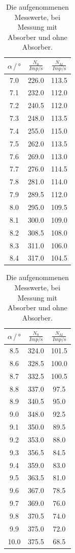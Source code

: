 \begin{table}
  \centering
  \caption{Die aufgenommenen Messwerte, bei Messung mit Absorber und ohne Absorber.}
  \begin{tabular}[t]{ccc}
  \toprule
  $\alpha \,/\, \si{\degree}$ & $\frac{N_0}{Imp/\si{\second}}$ & $\frac{N_\text{Al}}{Imp/\si{\second}}$ \\
  \midrule
  7.0 & 226.0 & 113.5 \\
  7.1 & 232.0 & 112.0\\
  7.2 & 240.5 & 112.0\\
  7.3 & 248.0 & 113.5\\
  7.4 & 255.0 & 115.0\\
  7.5 & 262.0 & 113.5\\
  7.6 & 269.0 & 113.0\\
  7.7 & 276.0 & 114.5\\
  7.8 & 281.0 & 114.0\\
  7.9 & 289.5 & 112.0\\
  8.0 & 295.0 & 109.5\\
  8.1 & 300.0 & 109.0\\
  8.2 & 308.5 & 108.0\\
  8.3 & 311.0 & 106.0\\
  8.4 & 317.0 & 104.5\\
  \bottomrule
\end{tabular}
\begin{tabular}[t]{ccc}
  \toprule
  $\alpha \,/\, \si{\degree}$ & $\frac{N_0}{Imp/\si{\second}}$ & $\frac{N_\text{Al}}{Imp/\si{\second}}$ \\
  \midrule
  8.5 & 324.0 & 101.5\\
  8.6 & 328.5 & 100.0\\
  8.7 & 332.5 & 100.5\\
  8.8 & 337.0 & 97.5\\
  8.9 & 340.5 & 95.0\\
  9.0 & 348.0 & 92.5\\
  9.1 & 350.0 & 89.5\\
  9.2 & 353.0 & 88.0\\
  9.3 & 356.5 & 84.5\\
  9.4 & 359.0 & 83.0\\
  9.5 & 363.5 & 81.0\\
  9.6 & 367.0 & 78.5\\
  9.7 & 369.0 & 76.0\\
  9.8 & 370.5 & 74.0\\
  9.9 & 375.0 & 72.0\\
  10.0 & 375.5 & 68.5\\
  \bottomrule
  \end{tabular}
  \label{tab:comp}
\end{table}


